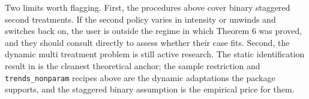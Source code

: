  Two limits worth flagging. First, the procedures above cover binary staggered second treatments. If the second policy varies in intensity or unwinds and switches back on, the user is outside the regime in which Theorem 6 was proved, and they should consult \citet{dCDH2023} directly to assess whether their case fits. Second, the dynamic multi treatment problem is still active research. The static identification result in \citet{dCDH2023} is the cleanest theoretical anchor; the sample restriction and \texttt{trends\_nonparam} recipes above are the dynamic adaptations the package supports, and the staggered binary assumption is the empirical price for them.
